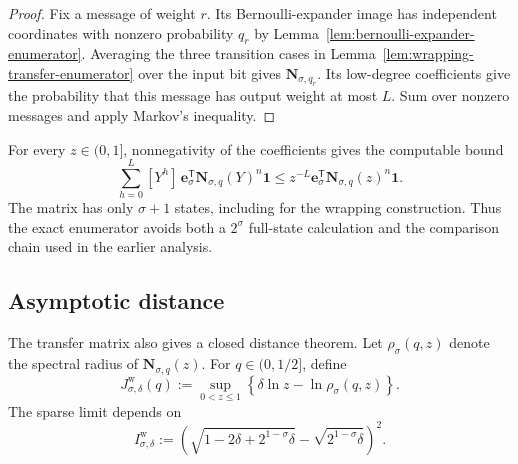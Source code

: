 \begin{proof}
Fix a message of weight $r$.  Its Bernoulli-expander image has independent
coordinates with nonzero probability $q_r$ by
Lemma~\ref{lem:bernoulli-expander-enumerator}.  Averaging the three transition
cases in Lemma~\ref{lem:wrapping-transfer-enumerator} over the input bit gives
$\mathbf N_{\sigma,q_r}$.  Its low-degree coefficients give the probability
that this message has output weight at most $L$.  Sum over nonzero messages
and apply Markov's inequality.
\end{proof}

For every $z\in(0,1]$, nonnegativity of the coefficients gives the computable
bound
\begin{equation}
 \sum_{h=0}^{L}[Y^h]\,
 \mathbf e_\sigma^\mathsf{T}\mathbf N_{\sigma,q}(Y)^n\mathbf 1
 \leq z^{-L}\mathbf e_\sigma^\mathsf{T}
 \mathbf N_{\sigma,q}(z)^n\mathbf 1.
 \label{eq:wrapped-expand-convolute-chernoff}
\end{equation}
The matrix has only $\sigma+1$ states, including for the wrapping construction.
Thus the exact enumerator avoids both a $2^\sigma$ full-state calculation and
the comparison chain used in the earlier analysis.

\subsection{Asymptotic distance}
\label{sec:wrapped-ec-asymptotic}

The transfer matrix also gives a closed distance theorem.  Let
$\rho_\sigma(q,z)$ denote the spectral radius of
$\mathbf N_{\sigma,q}(z)$.  For $q\in(0,1/2]$, define
\begin{equation}
 J^{\mathrm{w}}_{\sigma,\delta}(q)
 :=\sup_{0<z\leq1}
 \left\{\delta\ln z-\ln\rho_\sigma(q,z)\right\}.
 \label{eq:wrapped-ec-tail-rate}
\end{equation}
The sparse limit depends on
\begin{equation}
 I^{\mathrm{w}}_{\sigma,\delta}
 :=
 \left(
  \sqrt{1-2\delta+2^{1-\sigma}\delta}
  -\sqrt{2^{1-\sigma}\delta}
 \right)^2.
 \label{eq:wrapped-ec-sparse-rate}
\end{equation}

